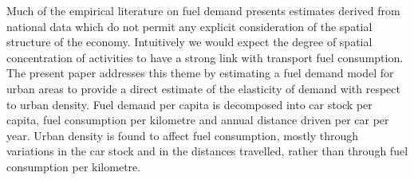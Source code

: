 Much of the empirical literature on fuel demand presents estimates derived from national data which do not permit any explicit consideration of the spatial structure of the economy. Intuitively we would expect the degree of spatial concentration of activities to have a strong link with transport fuel consumption. The present paper addresses this theme by estimating a fuel demand model for urban areas to provide a direct estimate of the elasticity of demand with respect to urban density. Fuel demand per capita is decomposed into car stock per capita, fuel consumption per kilometre and annual distance driven per car per year. Urban density is found to affect fuel consumption, mostly through variations in the car stock and in the distances travelled, rather than through fuel consumption per kilometre.